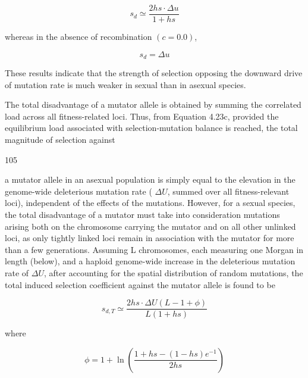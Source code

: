 \documentclass{article}
\begin{document}
\begin{equation}
s_{d}\simeq\frac{2h s\cdot\Delta u}{1+h s}
\tag{4.23b}
\label{eq:4_23b}
\end{equation}

whereas in the absence of recombination  $ (c = 0.0) $,

\begin{equation}
s_{d}=\Delta u
\tag{4.23c}
\label{eq:4_23c}
\end{equation}

These results indicate that the strength of selection opposing the downward drive of mutation rate is much weaker in sexual than in asexual species.

The total disadvantage of a mutator allele is obtained by summing the correlated load across all fitness-related loci. Thus, from Equation 4.23c, provided the equilibrium load associated with selection-mutation balance is reached, the total magnitude of selection against

105

a mutator allele in an asexual population is simply equal to the elevation in the genome-wide deleterious mutation rate ( $ \Delta U $, summed over all fitness-relevant loci), independent of the effects of the mutations. However, for a sexual species, the total disadvantage of a mutator must take into consideration mutations arising both on the chromosome carrying the mutator and on all other unlinked loci, as only tightly linked loci remain in association with the mutator for more than a few generations. Assuming L chromosomes, each measuring one Morgan in length (below), and a haploid genome-wide increase in the deleterious mutation rate of  $ \Delta U $, after accounting for the spatial distribution of random mutations, the total induced selection coefficient against the mutator allele is found to be

\begin{equation}
s_{d,T}\simeq\frac{2h s\cdot\Delta U(L-1+\phi)}{L(1+h s)}
\tag{4.24a}
\label{eq:4_24a}
\end{equation}

where

\begin{equation}
\phi=1+\ln\left(\frac{1+hs-(1-hs)e^{-1}}{2hs}\right)
\tag{4.24b}
\label{eq:4_24b}
\end{equation}
\end{document}
